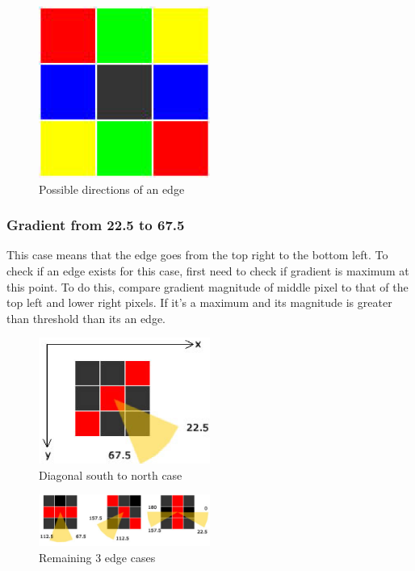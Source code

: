 \begin{figure}[ht!]
{
\centering
\includegraphics[width=0.5\textwidth]{eps_pics/possible-neighbors}
\caption{Possible directions of an edge}
\label{fig:possibleNeighbors}
}
\end{figure}

\subsubsection{Gradient from 22.5 to 67.5}

This case means that the edge goes from the top right to the bottom left. To check if an edge exists for this case, first need to check if gradient is maximum at this point. To do this, compare gradient magnitude of middle pixel to that of the top left and lower right pixels. If it's a maximum and its magnitude is greater than threshold than its an edge.

\begin{figure}[ht!]
{
\centering
\includegraphics[width=0.5\textwidth]{eps_pics/edge-direction-451}
\caption{Diagonal south to north case}
\label{fig:edge_direction_south_to_north}
}
\end{figure}


\begin{figure}[ht!]
{
\centering
\includegraphics[width=0.5\textwidth]{eps_pics/edge-direction-all}
\caption{Remaining 3 edge cases}
\label{fig:edge_direction_all}
}
\end{figure}
